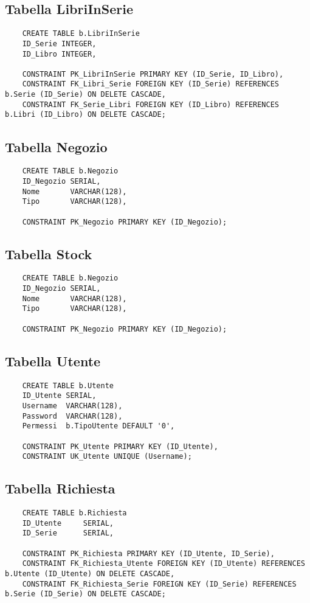 \newpage

\subsection{Tabella LibriInSerie}
\begin{lstlisting}
    CREATE TABLE b.LibriInSerie
    ID_Serie INTEGER,
    ID_Libro INTEGER,

    CONSTRAINT PK_LibriInSerie PRIMARY KEY (ID_Serie, ID_Libro),
    CONSTRAINT FK_Libri_Serie FOREIGN KEY (ID_Serie) REFERENCES b.Serie (ID_Serie) ON DELETE CASCADE,
    CONSTRAINT FK_Serie_Libri FOREIGN KEY (ID_Libro) REFERENCES b.Libri (ID_Libro) ON DELETE CASCADE;
\end{lstlisting}

\subsection{Tabella Negozio}
\begin{lstlisting}
    CREATE TABLE b.Negozio
    ID_Negozio SERIAL,
    Nome       VARCHAR(128),
    Tipo       VARCHAR(128),

    CONSTRAINT PK_Negozio PRIMARY KEY (ID_Negozio);
\end{lstlisting}

\subsection{Tabella Stock}
\begin{lstlisting}
    CREATE TABLE b.Negozio
    ID_Negozio SERIAL,
    Nome       VARCHAR(128),
    Tipo       VARCHAR(128),

    CONSTRAINT PK_Negozio PRIMARY KEY (ID_Negozio);
\end{lstlisting}

\subsection{Tabella Utente}
\begin{lstlisting}
    CREATE TABLE b.Utente
    ID_Utente SERIAL,
    Username  VARCHAR(128),
    Password  VARCHAR(128),
    Permessi  b.TipoUtente DEFAULT '0',

    CONSTRAINT PK_Utente PRIMARY KEY (ID_Utente),
    CONSTRAINT UK_Utente UNIQUE (Username);
\end{lstlisting}

\newpage

\subsection{Tabella Richiesta}
\begin{lstlisting}
    CREATE TABLE b.Richiesta
    ID_Utente     SERIAL,
    ID_Serie      SERIAL,

    CONSTRAINT PK_Richiesta PRIMARY KEY (ID_Utente, ID_Serie),
    CONSTRAINT FK_Richiesta_Utente FOREIGN KEY (ID_Utente) REFERENCES b.Utente (ID_Utente) ON DELETE CASCADE,
    CONSTRAINT FK_Richiesta_Serie FOREIGN KEY (ID_Serie) REFERENCES b.Serie (ID_Serie) ON DELETE CASCADE;
\end{lstlisting}

